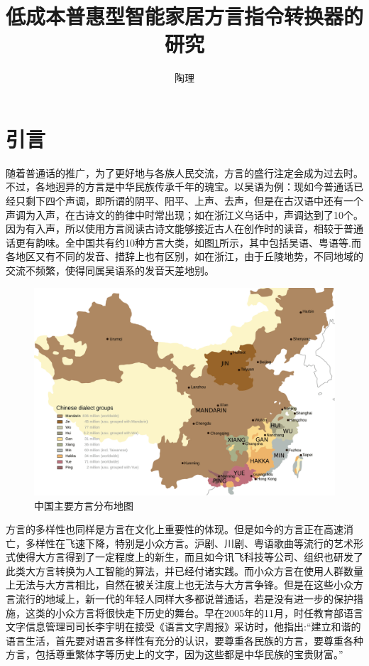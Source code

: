 \documentclass[lang=cn,cite=super]{elegantpaper}
\title{低成本普惠型智能家居方言指令转换器的研究}
\author{陶理}
\begin{document}
\maketitle
\begin{abstract}
\end{abstract}
\newpage
\begin{center}
    \tableofcontents
\end{center}
\newpage
\setcounter{section}{-1}
\section{引言}
随着普通话的推广，为了更好地与各族人民交流，方言的盛行注定会成为过去时。不过，各地迥异的方言是中华民族传承千年的瑰宝。以吴语为例：现如今普通话已经只剩下四个声调，即所谓的阴平、阳平、上声、去声，但是在古汉语中还有一个声调为入声，在古诗文的韵律中时常出现；如在浙江义乌话中，声调达到了10个。因为有入声，所以使用方言阅读古诗文能够接近古人在创作时的读音，相较于普通话更有韵味。全中国共有约10种方言大类，如图\ref{fig:chinese-lanaguages-map}所示，其中包括吴语、粤语等.而各地区又有不同的发音、措辞上也有区别，如在浙江，由于丘陵地势，不同地域的交流不频繁，使得同属吴语系的发音天差地别。
\begin{figure}[h]
    \caption{\label{fig:chinese-lanaguages-map}中国主要方言分布地图}
    \centering
    \includegraphics[scale=0.2]{chinese-lanaguages-map.png}
\end{figure}

方言的多样性也同样是方言在文化上重要性的体现。但是如今的方言正在高速消亡，多样性在飞速下降，特别是小众方言。沪剧、川剧、粤语歌曲等流行的艺术形式使得大方言得到了一定程度上的新生，而且如今讯飞科技等公司、组织也研发了此类大方言转换为人工智能的算法，并已经付诸实践。而小众方言在使用人群数量上无法与大方言相比，自然在被关注度上也无法与大方言争锋。但是在这些小众方言流行的地域上，新一代的年轻人同样大多都说普通话，若是没有进一步的保护措施，这类的小众方言将很快走下历史的舞台。早在2005年的11月，时任教育部语言文字信息管理司司长李宇明在接受《语言文字周报》采访时，他指出:“建立和谐的语言生活，首先要对语言多样性有充分的认识，要尊重各民族的方言，要尊重各种方言，包括尊重繁体字等历史上的文字，因为这些都是中华民族的宝贵财富。”
\end{document}
